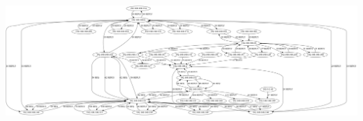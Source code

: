 \newline
\centerline{\includegraphics[angle=0,scale=0.3]{./graficos/grafos-arp/grafo_laburo_eze2.png}}